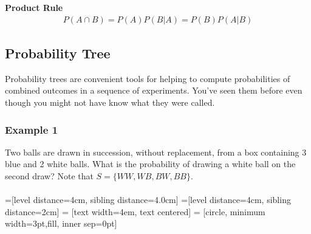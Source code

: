 \documentclass[14pt]{extarticle}
\begin{document}
\begin{tcolorbox}[enhanced jigsaw,colback=bg,boxrule=0pt,arc=0pt] 
	\textbf{Product Rule}
	\begin{align*}
		P(A\cap B) = P(A)P(B|A) = P(B)P(A|B)
	\end{align*}
\end{tcolorbox}

\subsection{Probability Tree}
Probability trees are convenient tools for helping to compute probabilities of combined outcomes in a sequence of experiments. You've seen them before even though you might not have know what they were called.

\subsubsection{Example 1}
Two balls are drawn in succession, without replacement, from a box containing 3 blue and 2 white balls. What is the probability of drawing a white ball on the second draw? Note that $S=\{WW, WB, BW, BB\}$.
\\\\

=[level distance=4cm, sibling distance=4.0cm]
=[level distance=4cm, sibling distance=2cm]
 = [text width=4em, text centered]
 = [circle, minimum width=3pt,fill, inner sep=0pt]
\end{document}
